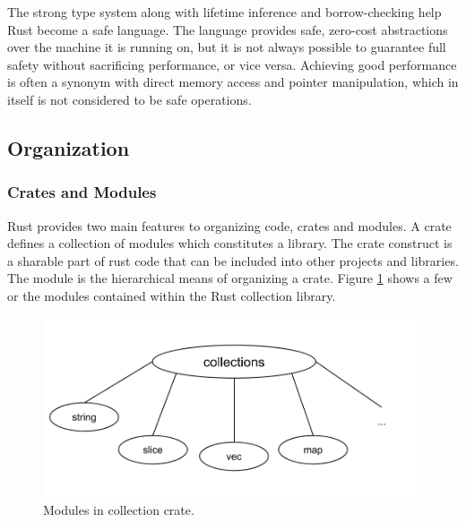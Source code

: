 The strong type system along with lifetime inference and borrow-checking help Rust become a safe language.
The language provides safe, zero-cost abstractions over the machine it is running on, but it is not always possible to guarantee full safety without sacrificing performance, or vice versa.
Achieving good performance is often a synonym with direct memory access and pointer manipulation, which in itself is not considered to be safe operations.


\subsection{Organization}
\label{ssub:rust:organization}

\subsubsection{Crates and Modules}

Rust provides two main features to organizing code, crates and modules.
A crate defines a collection of modules which constitutes a library.
The crate construct is a sharable part of rust code that can be included into other projects and libraries.
The module is the hierarchical means of organizing a crate.
Figure \ref{fig:rust:collections} shows a few or the modules contained within the Rust collection library.

\begin{figure}[H]
  \begin{center}
    \includegraphics[scale=0.3]{figures/background/rust/libcollections.png}
  \end{center}
  \caption{Modules in collection crate.}
  \label{fig:rust:collections}
\end{figure}


